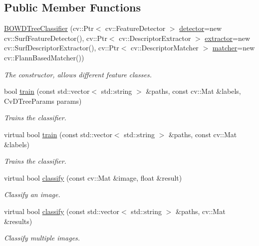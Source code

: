 \subsection*{Public Member Functions}
\begin{DoxyCompactItemize}
\item 
\hyperlink{classBOWDTreeClassifier_abc4ea05acf14a76e5670371f8acd1917}{BOWDTreeClassifier} (cv::Ptr$<$ cv::FeatureDetector $>$ \hyperlink{classBOWClassifier_af98420aa410054ef3010f4c098931a41}{detector}=new cv::SurfFeatureDetector(), cv::Ptr$<$ cv::DescriptorExtractor $>$ \hyperlink{classBOWClassifier_a429b9a83879611a7c3e06eeacec9fb18}{extractor}=new cv::SurfDescriptorExtractor(), cv::Ptr$<$ cv::DescriptorMatcher $>$ \hyperlink{classBOWClassifier_a35057956434d92402d24f2628cfaf35c}{matcher}=new cv::FlannBasedMatcher())
\begin{DoxyCompactList}\small\item\em The constructor, allows different feature classes. \item\end{DoxyCompactList}\item 
bool \hyperlink{classBOWDTreeClassifier_a9bcdcb5fa8bb35d5d4a518b7a060c127}{train} (const std::vector$<$ std::string $>$ \&paths, const cv::Mat \&labels, CvDTreeParams params)
\begin{DoxyCompactList}\small\item\em Trains the classifier. \item\end{DoxyCompactList}\item 
virtual bool \hyperlink{classBOWDTreeClassifier_ade9a3a1bf1ada1a2fdeefa96eb67edd0}{train} (const std::vector$<$ std::string $>$ \&paths, const cv::Mat \&labels)
\begin{DoxyCompactList}\small\item\em Trains the classifier. \item\end{DoxyCompactList}\item 
virtual bool \hyperlink{classBOWDTreeClassifier_acbdf32fc2b2463f099efdf4000f3e2c1}{classify} (const cv::Mat \&image, float \&result)
\begin{DoxyCompactList}\small\item\em Classify an image. \item\end{DoxyCompactList}\item 
virtual bool \hyperlink{classBOWDTreeClassifier_a5fcc85024df510e3c9ec813fe09e23fe}{classify} (const std::vector$<$ std::string $>$ \&paths, cv::Mat \&results)
\begin{DoxyCompactList}\small\item\em Classify multiple images. \item\end{DoxyCompactList}\end{DoxyCompactItemize}


